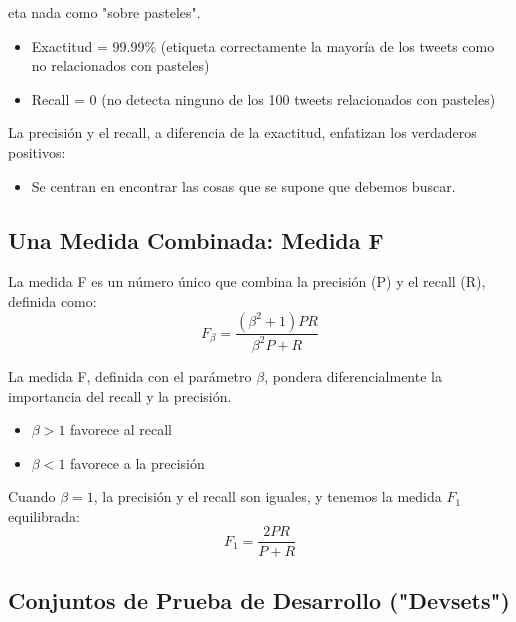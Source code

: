 \documentclass[11pt,fleqn]{book} %
\begin{document}
eta nada como "sobre pasteles".

\begin{itemize}
  \item Exactitud = 99.99\% (etiqueta correctamente la mayoría de los tweets como no relacionados con pasteles)
  \item Recall = 0 (no detecta ninguno de los 100 tweets relacionados con pasteles)
\end{itemize}

La precisión y el recall, a diferencia de la exactitud, enfatizan los verdaderos positivos:
\begin{itemize}
  \item Se centran en encontrar las cosas que se supone que debemos buscar.
\end{itemize}

\subsection{Una Medida Combinada: Medida F}
La medida F es un número único que combina la precisión (P) y el recall (R), definida como:
\[
F_\beta = \frac{(\beta^2+1)PR}{\beta^2P + R}
\]

La medida F, definida con el parámetro $\beta$, pondera diferencialmente la importancia del recall y la precisión.
\begin{itemize}
  \item $\beta > 1$ favorece al recall
  \item $\beta < 1$ favorece a la precisión
\end{itemize}

Cuando $\beta = 1$, la precisión y el recall son iguales, y tenemos la medida $F_1$ equilibrada:
\[
F_1 = \frac{2PR}{P + R}
\]

\subsection{Conjuntos de Prueba de Desarrollo ("Devsets")}
\end{document}

